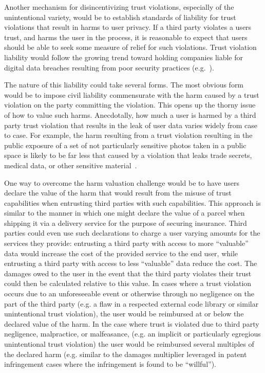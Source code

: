 Another mechanism for disincentivizing trust violations, especially of
the unintentional variety, would be to establish standards of
liability for trust violations that result in harms to user
privacy. If a third party violates a users trust, and harms the user
in the process, it is reasonable to expect that users should be able
to seek some measure of relief for such violations. Trust violation
liability would follow the growing trend toward holding companies
liable for digital data breaches resulting from poor security
practices (e.g.~\cite{ftc-asus}).

The nature of this liability could take several forms. The most
obvious form would be to impose civil liability commensurate with the
harm caused by a trust violation on the party committing the
violation. This opens up the thorny issue of how to value such
harms. Anecdotally, how much a user is harmed by a third party trust
violation that results in the leak of user data varies widely from
case to case. For example, the harm resulting from a trust violation
resulting in the public exposure of a set of not particularly
sensitive photos taken in a public space is likely to be far less that
caused by a violation that leaks trade secrets, medical data, or other
sensitive material~\cite{acquisti2013, romanosky2009}.

One way to overcome the harm valuation challenge would be to have
users declare the value of the harm that would result from the misuse
of trust capabilities when entrusting third parties with such
capabilities. This approach is similar to the manner in which one
might declare the value of a parcel when shipping it via a delivery
service for the purpose of securing insurance. Third parties could
even use such declarations to charge a user varying amounts for the
services they provide: entrusting a third party with access to more
``valuable'' data would increase the cost of the provided service to
the end user, while entrusting a third party with access to less
``valuable'' data reduce the cost. The damages owed to the user in the
event that the third party violates their trust could then be
calculated relative to this value. In cases where a trust violation
occurs due to an unforeseeable event or otherwise through no
negligence on the part of the third party (e.g. a flaw in a respected
external code library or similar unintentional trust violation), the
user would be reimbursed at or below the declared value of the
harm. In the case where trust is violated due to third party
negligence, malpractice, or malfeasance, (e.g. an implicit or
particularly egregious unintentional trust violation) the user would
be reimbursed several multiples of the declared harm (e.g. similar to
the damages multiplier leveraged in patent infringement cases where
the infringement is found to be ``willful'').

